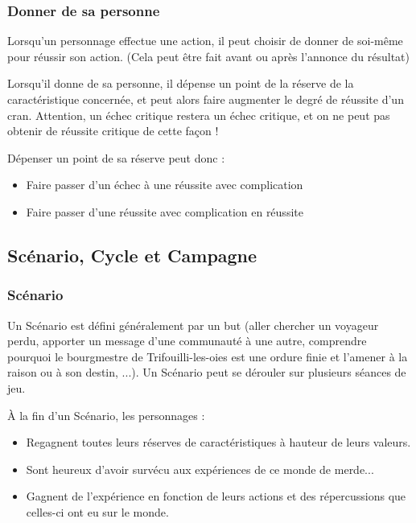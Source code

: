 \documentclass[twoside,12pt,english]{book}
\begin{document}
\subsubsection*{Donner de sa personne}

Lorsqu'un personnage effectue une action, il peut choisir de donner de soi-même pour réussir son action. (Cela peut être fait avant ou après l'annonce du résultat)

Lorsqu'il donne de sa personne, il dépense un point de la réserve de la caractéristique concernée, et peut alors faire augmenter le degré de réussite d'un cran. Attention, un échec critique restera un échec critique, et on ne peut pas obtenir de réussite critique de cette façon !

Dépenser un point de sa réserve peut donc :

\begin{itemize}
	\item Faire passer d'un échec à une réussite avec complication
	\item Faire passer d'une réussite avec complication en réussite
\end{itemize}

\subsection{Scénario, Cycle et Campagne}

\subsubsection*{Scénario}

Un Scénario est défini généralement par un but (aller chercher un voyageur perdu, apporter un message d'une communauté à une autre, comprendre pourquoi le bourgmestre de Trifouilli-les-oies est une ordure finie et l'amener à la raison ou à son destin, ...). Un Scénario peut se dérouler sur plusieurs séances de jeu.

À la fin d'un Scénario, les personnages :

\begin{itemize}
	\item Regagnent toutes leurs réserves de caractéristiques à hauteur de leurs valeurs.
	\item Sont heureux d'avoir survécu aux expériences de ce monde de merde...
	\item Gagnent de l'expérience en fonction de leurs actions et des répercussions que celles-ci ont eu sur le monde.
\end{itemize}
\end{document}
